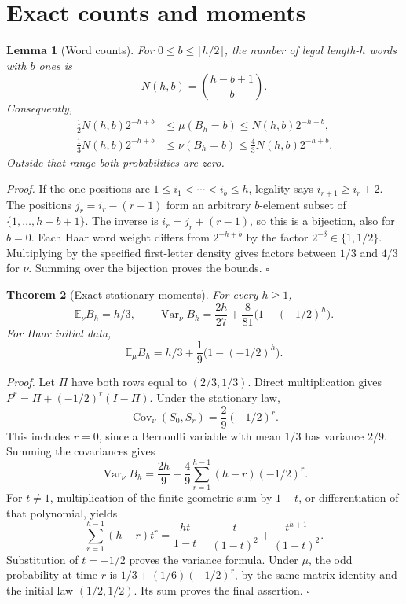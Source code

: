 \documentclass[11pt,letterpaper]{article}
\newtheorem{theorem}{Theorem}
\newtheorem{lemma}[theorem]{Lemma}
\newenvironment{proof}{\noindent\textit{Proof.}}{\hfill\(\square\)}
\begin{document}
\section{Exact counts and moments}

\begin{lemma}[Word counts]
For \(0\le b\le\lceil h/2\rceil\), the number of legal length-\(h\)
words with \(b\) ones is
\[
N(h,b)=\binom{h-b+1}{b}.
\]
Consequently,
\[
\begin{aligned}
\tfrac12 N(h,b)2^{-h+b}
&\le\mu(B_h=b)\le N(h,b)2^{-h+b},\\
\tfrac13 N(h,b)2^{-h+b}
&\le\nu(B_h=b)\le\tfrac43 N(h,b)2^{-h+b}.
\end{aligned}
\]
Outside that range both probabilities are zero.
\end{lemma}

\begin{proof}
If the one positions are \(1\le i_1<\cdots<i_b\le h\), legality says
\(i_{r+1}\ge i_r+2\). The positions \(j_r=i_r-(r-1)\) form an
arbitrary \(b\)-element subset of \(\{1,\ldots,h-b+1\}\).
The inverse is \(i_r=j_r+(r-1)\), so this is a bijection, also for
\(b=0\). Each Haar word weight differs from \(2^{-h+b}\) by the
factor \(2^{-\delta}\in\{1,1/2\}\). Multiplying by the specified
first-letter density gives factors between \(1/3\) and \(4/3\)
for \(\nu\). Summing over the bijection proves the bounds.
\end{proof}

\begin{theorem}[Exact stationary moments]
\label{thm:moments}
For every \(h\ge1\),
\[
\mathbb E_\nu B_h=h/3,\qquad
\operatorname{Var}_\nu B_h
=\frac{2h}{27}+\frac8{81}\bigl(1-(-1/2)^h\bigr).
\]
For Haar initial data,
\[
\mathbb E_\mu B_h=h/3+\frac19\bigl(1-(-1/2)^h\bigr).
\]
\end{theorem}

\begin{proof}
Let \(\Pi\) have both rows equal to \((2/3,1/3)\). Direct
multiplication gives \(P^r=\Pi+(-1/2)^r(I-\Pi)\).
Under the stationary law,
\[
\operatorname{Cov}_\nu(S_0,S_r)=\frac29(-1/2)^r.
\]
This includes \(r=0\), since a Bernoulli variable with mean \(1/3\)
has variance \(2/9\). Summing the covariances gives
\[
\operatorname{Var}_\nu B_h
=\frac{2h}9+\frac49\sum_{r=1}^{h-1}(h-r)(-1/2)^r.
\]
For \(t\ne1\), multiplication of the finite geometric sum by
\(1-t\), or differentiation of that polynomial, yields
\[
\sum_{r=1}^{h-1}(h-r)t^r
=\frac{ht}{1-t}-\frac{t}{(1-t)^2}
+\frac{t^{h+1}}{(1-t)^2}.
\]
Substitution of \(t=-1/2\) proves the variance formula.
Under \(\mu\), the odd probability at time \(r\) is
\(1/3+(1/6)(-1/2)^r\), by the same matrix identity and the initial
law \((1/2,1/2)\). Its sum proves the final assertion.
\end{proof}
\end{document}
